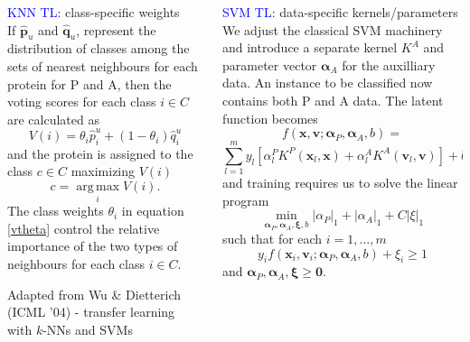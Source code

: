\documentclass[bigger]{beamer}
\newcommand{\bx}{\mathbf{x}}
\newcommand{\bv}{\mathbf{v}}
\newcommand{\bp}{\mathbf{p}}
\newcommand{\bq}{\mathbf{q}}
\newcommand{\bxi}{\bm{\xi}}
\newcommand{\bal}{\bm{\alpha}}
\begin{document}
\begin{frame}

  \begin{columns}[t]
    \begin{column}[T]{0.5\textwidth}\textcolor{Blue}{KNN TL}: class-specific weights\\
    \scriptsize{If $\hat{\bp}_u$
and $\hat{\bq}_u$, represent the distribution of classes among the sets of nearest 
neighbours for each protein for P and A, then the voting scores for each
class $i \in C$ are calculated as \begin{equation*} V(i) = \theta_i
\hat{p}_i^u + (1 - \theta_i) \hat{q}_i^u \label{vtheta} \end{equation*}
and the protein is assigned to the class $c \in C$ maximizing $V(i)$
\[ c = \operatorname*{arg\,max}_i V(i) .  \] The class weights
$\theta_i$ in equation \ref{vtheta} control the relative importance of
the two types of neighbours for each class $i \in C$.}

\vspace{2cm}

{\tiny Adapted from Wu \& Dietterich (ICML '04) - transfer learning with $k$-NNs and SVMs}

    \end{column}
    
    \begin{column}[T]{0.5\textwidth}\textcolor{Blue}{SVM TL}: data-specific kernels/parameters\\
        \scriptsize{We adjust the classical SVM machinery and introduce a
separate kernel $K^A$ and parameter vector $\bal_A$ for the auxilliary
data. An instance to be classified now contains both P and A data. The latent function becomes \[ f(\bx,
\bv; \bal_P, \bal_A, b) =  \]  \[ \sum_{l=1}^m y_l \left[ \alpha_l^P
K^P(\bx_l, \bx) + \alpha_l^A K^A(\bv_l, \bv) \right] + b \] and
training requires us to solve the linear program \begin{equation*}
\min_{\bal_P,\bal_A,\bxi,b} |\alpha_P|_1 + |\alpha_A|_1 + C|\xi|_1
\label{ob2} \end{equation*} such that for each $i = 1,\ldots,m$ \[ y_i
f(\bx_i, \bv_i; \bal_P, \bal_A, b) + \xi_i \geq 1 \] and $\bal_P,
\bal_A, \bxi \geq \bm{0}$.}
    \end{column}
    
  \end{columns}
\end{frame}

\end{document}
